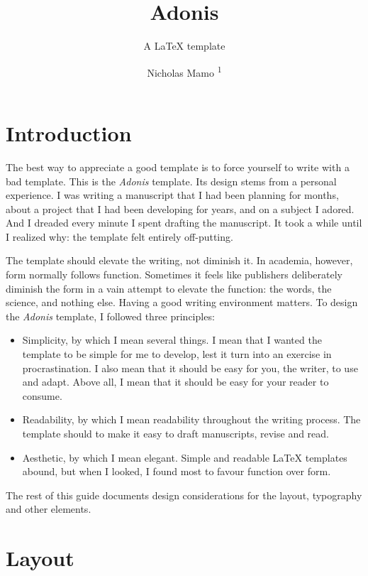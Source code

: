 \documentclass{adonis}
\title{Adonis}
\subtitle{A LaTeX template}
\author{Nicholas Mamo \textsuperscript{1}}
\affiliation{\textsuperscript{1} Independent}
\begin{document}
	\maketitle
	
	\section{Introduction}
	
		The best way to appreciate a good template is to force yourself to write with a bad template.
		This is the \textit{Adonis} template.
		Its design stems from a personal experience.
		I was writing a manuscript that I had been planning for months, about a project that I had been developing for years, and on a subject I adored.
		And I dreaded every minute I spent drafting the manuscript.
		It took a while until I realized why: the template felt entirely off-putting.
		
		The template should elevate the writing, not diminish it.
		In academia, however, form normally follows function.
		Sometimes it feels like publishers deliberately diminish the form in a vain attempt to elevate the function: the words, the science, and nothing else.
		Having a good writing environment matters.
		To design the \textit{Adonis} template, I followed three principles:
		
		\begin{itemize}
			\item Simplicity, by which I mean several things.
				  I mean that I wanted the template to be simple for me to develop, lest it turn into an exercise in procrastination.
				  I also mean that it should be easy for you, the writer, to use and adapt.
				  Above all, I mean that it should be easy for your reader to consume.
			
			\item Readability, by which I mean readability throughout the writing process.
				  The template should to make it easy to draft manuscripts, revise and read.
			
			\item Aesthetic, by which I mean elegant.
				  Simple and readable \LaTeX{} templates abound, but when I looked, I found most to favour function over form.
		\end{itemize}
	
		The rest of this guide documents design considerations for the layout, typography and other elements.
	
	\section{Layout}
	
\end{document}
